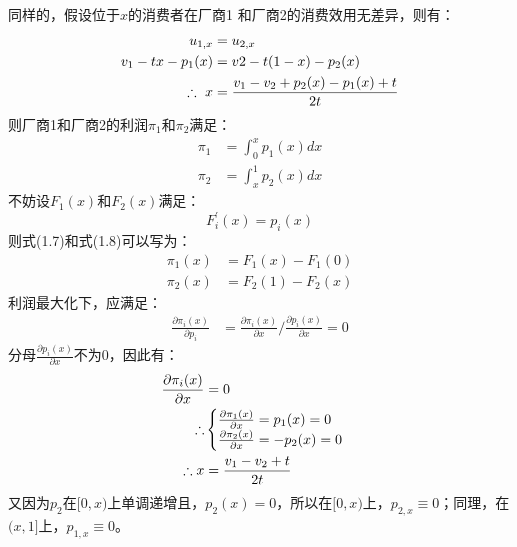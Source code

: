 同样的，假设位于$x$的消费者在厂商1 和厂商2的消费效用无差异，则有：
\begin{align}
     u_{1,x}&=u_{2,x} \notag \\ 
     v_1-tx-p_1(x) &= v2-t(1-x)-p_2(x) \notag \\
     \therefore \  x &= \frac{v_1-v_2+p_2(x)-p_1(x)+t}{2t}
\end{align}
则厂商1和厂商2的利润$\pi_1$和$\pi_2$满足：
\begin{align}
    \pi_1 &=\int_0^x p_1(x)dx \\
    \pi_2 &= \int_x^1 p_2(x)dx 
\end{align}
不妨设$F_1(x)$和$F_2(x)$满足：
\begin{equation*}
    F_i^{'} (x) = p_i(x)
\end{equation*}
则式(1.7)和式(1.8)可以写为：
\begin{align}
    \pi_1(x) &=F_1(x)-F_1(0) \\
    \pi_2(x) &=F_2(1)-F_2(x)
\end{align}
利润最大化下，应满足：
\begin{align}
    \frac{\partial \pi_i(x) }{\partial p_i} &=\frac{\partial \pi_i(x)}{\partial x}\bigg/\frac{\partial p_i(x)}{\partial x}=0 
\end{align}
分母$\frac{\partial p_i(x)}{\partial x}$不为0，因此有：
\begin{align}
    \frac{\partial \pi_i(x)}{\partial x} &=0 \notag\\
    \therefore &\begin{cases}
      \frac{\partial \pi_1(x)}{\partial x} = p_1(x) =0 \\
      \frac{\partial \pi_2(x)}{\partial x} = -p_2(x) =0
\end{cases}  \notag \\
    \therefore x &= \frac{v_1-v_2+t}{2t} 
\end{align}
又因为$p_2$在$[0,x)$上单调递增且，$p_2(x)=0$，所以在$[0,x)$上，$p_{2,x}\equiv0$；同理，在$(x,1]$上，$p_{1,x}\equiv0$。

